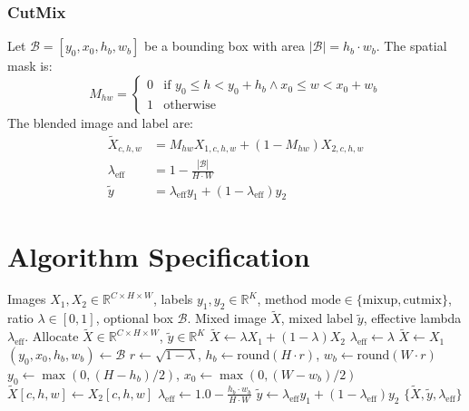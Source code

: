\documentclass[11pt,a4paper]{article}
\theoremstyle{definition}
\begin{document}
\subsubsection{CutMix}
Let $\mathcal{B} = [y_0, x_0, h_b, w_b]$ be a bounding box with area $|\mathcal{B}| = h_b \cdot w_b$. The spatial mask is:
\begin{equation}
M_{hw} = \begin{cases} 0 & \text{if } y_0 \le h < y_0 + h_b \land x_0 \le w < x_0 + w_b \\ 1 & \text{otherwise} \end{cases}
\end{equation}
The blended image and label are:
\begin{align}
\tilde{X}_{c, h, w} &= M_{hw} X_{1, c, h, w} + (1 - M_{hw}) X_{2, c, h, w} \\
\lambda_{\text{eff}} &= 1 - \frac{|\mathcal{B}|}{H \cdot W} \\
\tilde{y} &= \lambda_{\text{eff}} y_1 + (1 - \lambda_{\text{eff}}) y_2
\end{align}

\section{Algorithm Specification}

\begin{algorithm}[H]
\caption{Mixup and CutMix Hybrid Execution}
\label{alg:mixup_cutmix}
\begin{algorithmic}[1]
\Require Images $X_1, X_2 \in \mathbb{R}^{C \times H \times W}$, labels $y_1, y_2 \in \mathbb{R}^K$, method $\text{mode} \in \{\text{mixup}, \text{cutmix}\}$, ratio $\lambda \in [0, 1]$, optional box $\mathcal{B}$.
\Ensure Mixed image $\tilde{X}$, mixed label $\tilde{y}$, effective lambda $\lambda_{\text{eff}}$.
\State Allocate $\tilde{X} \in \mathbb{R}^{C \times H \times W}$, $\tilde{y} \in \mathbb{R}^K$
    \State $\tilde{X} \gets \lambda X_1 + (1 - \lambda) X_2$
    \State $\lambda_{\text{eff}} \gets \lambda$
    \State $\tilde{X} \gets X_1$
        \State $(y_0, x_0, h_b, w_b) \gets \mathcal{B}$
    \Else
        \State $r \gets \sqrt{1 - \lambda}$, $h_b \gets \text{round}(H \cdot r)$, $w_b \gets \text{round}(W \cdot r)$
        \State $y_0 \gets \max(0, (H - h_b) / 2)$, $x_0 \gets \max(0, (W - w_b) / 2)$
    \EndIf
                \State $\tilde{X}[c, h, w] \gets X_2[c, h, w]$
            \EndFor
        \EndFor
    \EndFor
    \State $\lambda_{\text{eff}} \gets 1.0 - \frac{h_b \cdot w_b}{H \cdot W}$
\EndIf
\State $\tilde{y} \gets \lambda_{\text{eff}} y_1 + (1 - \lambda_{\text{eff}}) y_2$
\State \Return $\{\tilde{X}, \tilde{y}, \lambda_{\text{eff}}\}$
\end{algorithmic}
\end{algorithm}
\end{document}
